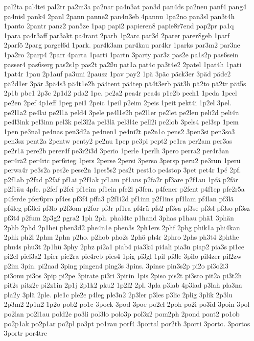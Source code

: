 {pal2ta
pal4tei
pal2tr
pa2m3a
pa2nar
pa4n3at
pan3d
pan4ds
pa2neu
panf4
pang4
pa4nisl
pank4
2panl
2pann
panne2
pan4n3eb
4pannu
1pa2no
pan3sl
pan3t4h
1panto
2pantr
panz2
pan5ze
1pap
papi2
papieren8
papie8r7end
pap2pr
pa1q
1para
pa4r3aff
par3akt
pa4rant
2parb
1p2arc
par3d
2parer
parer8geb
1parf
2parfö
2parg
pargel6d
1park.
par4k3am
par4kau
par4kr
1parks
par3m2
par3ne
1pa2ro
2parp4
2parr
4parta
1parti
1partn
3party
par3z
pas2e
pa1s2p
pas6sein
passer4
pas6serg
pas2s1p
pas2t
pa2ßu
pat1a
pat4c
pa3t4e2
2patel
1pat4h
1pati
1pat4r
1pau
2p1auf
pa3uni
2pausz
1pav
pay2
1pä
3päc
päck3er
3päd
päde2
pä2d1er
3pär
3pä4s3
pä4t1e2h
pä4tent
pä4tep
pä4t3erb
pät3h
pä2to
pä2tr
pät5s
2p1b
pbe1
2p3c
2p1d2
pda2
1pe.
pe2a2
pea4r
pea4s
p1e2b
pech1
1peda
1peel
pe2en
2pef
4p1eff
1peg
pei1
2peic
1peil
p2eim
2peis
1peit
pekt4i
1p2el
3pel.
pe2l1a2
pe4lai
pe2l1ä
peld4
3pele
pe4l1e2h
pe2l1er
pe2let
pe2leu
peli2d
peli4n
pe4l3ink
pel3inn
pel3k
pel3l2a
pel3lä
pel3l4e
pell2i
pe2lob
3pels4
pel3sp
1pem
1pen
pe3nal
pe4nas
pen3d2a
pe4nen1
pe4ni2t
pe2n1o
pens2
3pen3si
pen3so3
pen3sz
pent2a
2pentw
penty2
pe2nu
1pep
pe3pi
pept2
pe1ra
per2am
per3as
pe2r1ä
pere2b
perer4f
pe3r2i3d
3perio
1perle
1perlh
3pero
perra2
per4r3an
per4rä2
per4ric
per6rieg
1pers
2perse
2persi
3perso
3persp
peru2
pe3run
1perü
perwa4r
pe3s2a
pes2e
pese2n
1pes5s2
pes2t
pest1o
pe4stop
3pet
pet4r
1pé
2pf.
p2f1ab
p2fad
p2faf
pf1ai
p2f1ak
pf1am
pf1ans
p2fa2r
pf3are
p2f1au
1pfä
p2fär
p2f1äu
4pfe.
p2fef
p2fei
pf1eim
pf1ein
pfe2l
p3fen.
p4fener
p2fent
p4f1ep
pfe2r5a
p4ferde
pfer6pro
pf4es
pf3f4
pffa3
p2f1i2d
pf1inn
p2f1ins
pf1lam
pf4lan
pf3lä
pf4leg
pf3lei
pf3lo
p2f3om
p2for
pf3r
pf1ra
pf4rü
pfs2
pf3sa
pf3se
pf3sl
pf3so
pf3sz
pf3t4
p2fum
2p3g2
pgra2
1ph
2ph.
phal4te
p1hand
3phas
p1hau
phä1
3phän
2phb
2phd
2p1hei
phen3d2
phe4n1e
phen3s
2ph1ers
2phf
2phg
phik1a
phi4kan
2phk
ph2l
2phm
2phn
p2ho.
p2hob
pho2s
2phö
ph4r
2phro
2phs
ph3t4
2phthe
phu4s
phu3t
2p1hü
3phy
2phz
pi2a1
piab4
pia3k4
pi4ali
pia3n
piap2
pia3s
pi1ce
pi2el
piel3a2
1pier
pie2ra
pie4reb
pies4
1pig
pi3gl
1pil
pi3le
3pilo
pil4zer
pil2zw
p2im
3pin.
pi2nad
3ping
pingen4
ping3s
3pins.
3pinse
pin3s2p
pi2o
pi3o2i3
pi3onu
pi3os
3pip
pi2pe
3pirate
pi3ri
3pirin
1pis
2piso
pis2t
pi3sto
pit2a
pi3t2h
pit2s
pitz2e
pi2z1in
2p1j
2p1k2
pku2
1p2l2
2pl.
3pla
p3lab
4p3lad
p3lah
pla3na
pla2y
3plä
2ple.
ple1c
ple2e
p4leg
ple3n2
2p3ler
p3les
p3lic
2plig
3plik
2p3lu
2p3m2
2p1n2
1p2o
pob2
po1c
3pock
3pod
3poe
po2el
2poh
po2i
po3id
3poin
3pol
po2lan
po2l1au
pold2e
po3li
pol3lo
polo3p
pol3z2
pom2ph
2pond
pont2
po1ob
po2p1ak
po2p1ar
po2pl
po3pt
po1rau
porf4
3portal
por2th
3porti
3porto.
3portos
3portr
por4tre
}
